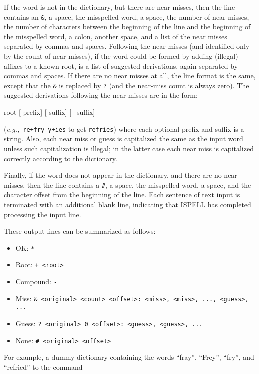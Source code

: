 \documentclass[noabs,nolof,twoside,11pt]{starlink}
\begin{document}
\begin{itemize}
If the word is not in the dictionary, but there are near misses, then the
line contains an \verb+&+, a space, the misspelled word, a space, the number of
near misses, the number of characters between the beginning of the line and
the beginning of the misspelled word, a colon, another space, and a list of
the near misses separated by commas and spaces.
Following the near misses (and identified only by the count of near misses), if
the word could be formed by adding (illegal) affixes to a known root, is a
list of suggested derivations, again separated by commas and spaces.
If there are no near misses at all, the line format is the same, except that
the \verb+&+ is replaced by \verb+?+ (and the near-miss count is always zero).
The suggested derivations following the near misses are in the form:

\begin{terminalv}
[prefix+] root [-prefix] [-suffix] [+suffix]
\end{terminalv}

({\it{e.g.,}}\ \verb=re+fry-y+ies= to get \verb+refries+) where each optional
prefix and suffix is a string.
Also, each near miss or guess is capitalized the same as the input word unless
such capitalization is illegal; in the latter case each near miss is
capitalized correctly according to the dictionary.

Finally, if the word does not appear in the dictionary, and there are no
near misses, then the line contains a \verb+#+, a space, the misspelled word, a
space, and the character offset from the beginning of the line.
Each sentence of text input is terminated with an additional blank line,
indicating that ISPELL has completed processing the input line.

These output lines can be summarized as follows:

\begin{itemize}
   \item OK:
       \verb+*+
   \item Root:
       \verb-+ <root>-
   \item Compound:
       \verb+-+
   \item Miss:
       \verb+& <original> <count> <offset>: <miss>, <miss>, ..., <guess>, ...+
   \item Guess:
       \verb+? <original> 0 <offset>: <guess>, <guess>, ...+
   \item None:
       \verb+# <original> <offset>+
\end{itemize}

For example, a dummy dictionary containing the words ``fray'', ``Frey'',
``fry'', and ``refried'' to the command


\end{itemize}
\end{document}
